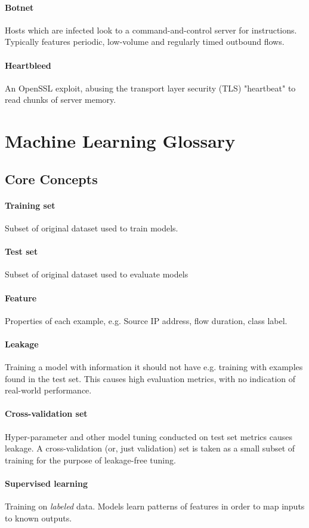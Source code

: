 \documentclass{article}
\begin{document}
\begin{appendices}
\paragraph{Botnet} Hosts which are infected look to a command-and-control server for instructions. Typically features periodic, low-volume and regularly timed outbound flows.
\paragraph{Heartbleed} An OpenSSL exploit, abusing the transport layer security (TLS) "heartbeat" to read chunks of server memory.
\section{Machine Learning Glossary}
\subsection{Core Concepts}
\paragraph{Training set} Subset of original dataset used to train models.
\paragraph{Test set} Subset of original dataset used to evaluate models
\paragraph{Feature} Properties of each example, e.g. Source IP address, flow duration, class label.
\paragraph{Leakage} Training a model with information it should not have e.g. training with examples found in the test set. This causes high evaluation metrics, with no indication of real-world performance.
\paragraph{Cross-validation set} Hyper-parameter and other model tuning conducted on test set metrics causes leakage. A cross-validation (or, just validation) set is taken as a small subset of training for the purpose of leakage-free tuning.
\paragraph{Supervised learning} Training on \textit{labeled} data. Models learn patterns of features in order to map inputs to known outputs.

\end{appendices}
\end{document}
